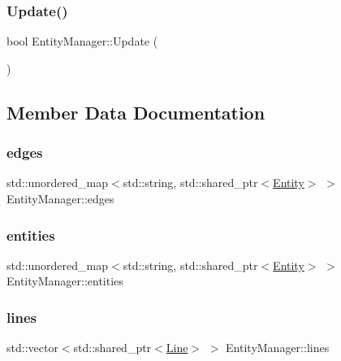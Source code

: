 \subsubsection{\texorpdfstring{Update()}{Update()}}
{\footnotesize\ttfamily bool Entity\+Manager\+::\+Update (\begin{DoxyParamCaption}{ }\end{DoxyParamCaption})}



\subsection{Member Data Documentation}
\mbox{\label{classEntityManager_ae93f9beb111b9464327a70173411fda6}} 
\subsubsection{\texorpdfstring{edges}{edges}}
{\footnotesize\ttfamily std\+::unordered\+\_\+map$<$std\+::string, std\+::shared\+\_\+ptr$<$\hyperlink{classEntity}{Entity}$>$ $>$ Entity\+Manager\+::edges\hspace{0.3cm}{\ttfamily [private]}}

\mbox{\label{classEntityManager_a9c442e6363c2269e9c95db90762367f3}} 
\subsubsection{\texorpdfstring{entities}{entities}}
{\footnotesize\ttfamily std\+::unordered\+\_\+map$<$std\+::string, std\+::shared\+\_\+ptr$<$\hyperlink{classEntity}{Entity}$>$ $>$ Entity\+Manager\+::entities\hspace{0.3cm}{\ttfamily [private]}}

\mbox{\label{classEntityManager_ae56b17654dc5fbdac4bb2359292cb369}} 
\subsubsection{\texorpdfstring{lines}{lines}}
{\footnotesize\ttfamily std\+::vector$<$std\+::shared\+\_\+ptr$<$\hyperlink{classLine}{Line}$>$ $>$ Entity\+Manager\+::lines\hspace{0.3cm}{\ttfamily [private]}}

